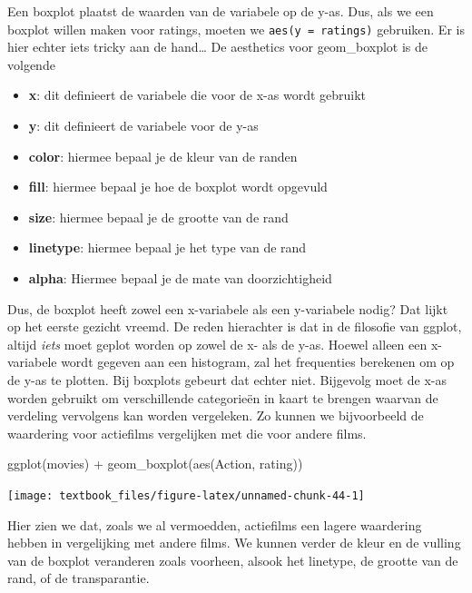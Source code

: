 \documentclass[]{tufte-book}
\newenvironment{Shaded}{}{}
\newcommand{\FunctionTok}[1]{\textcolor[rgb]{0.02,0.16,0.49}{#1}}
\newcommand{\NormalTok}[1]{#1}
\newcommand{\SpecialCharTok}[1]{\textcolor[rgb]{0.25,0.44,0.63}{#1}}
\providecommand{\tightlist}{%
  \setlength{\itemsep}{0pt}\setlength{\parskip}{0pt}}
\begin{document}
Een boxplot plaatst de waarden van de variabele op de y-as. Dus, als we een boxplot willen maken voor ratings, moeten we \texttt{aes(y\ =\ ratings)} gebruiken. Er is hier echter iets tricky aan de hand\ldots{} De aesthetics voor geom\_boxplot is de volgende

\begin{itemize}
\tightlist
\item
  \textbf{x}: dit definieert de variabele die voor de x-as wordt gebruikt
\item
  \textbf{y}: dit definieert de variabele voor de y-as
\item
  \textbf{color}: hiermee bepaal je de kleur van de randen
\item
  \textbf{fill}: hiermee bepaal je hoe de boxplot wordt opgevuld
\item
  \textbf{size}: hiermee bepaal je de grootte van de rand
\item
  \textbf{linetype}: hiermee bepaal je het type van de rand
\item
  \textbf{alpha}: Hiermee bepaal je de mate van doorzichtigheid
\end{itemize}

Dus, de boxplot heeft zowel een x-variabele als een y-variabele nodig? Dat lijkt op het eerste gezicht vreemd. De reden hierachter is dat in de filosofie van ggplot, altijd \emph{iets} moet geplot worden op zowel de x- als de y-as. Hoewel alleen een x-variabele wordt gegeven aan een histogram, zal het frequenties berekenen om op de y-as te plotten. Bij boxplots gebeurt dat echter niet. Bijgevolg moet de x-as worden gebruikt om verschillende categorieën in kaart te brengen waarvan de verdeling vervolgens kan worden vergeleken. Zo kunnen we bijvoorbeeld de waardering voor actiefilms vergelijken met die voor andere films.

\begin{Shaded}
\begin{Highlighting}[]
\FunctionTok{ggplot}\NormalTok{(movies) }\SpecialCharTok{+}
  \FunctionTok{geom\_boxplot}\NormalTok{(}\FunctionTok{aes}\NormalTok{(Action, rating))}
\end{Highlighting}
\end{Shaded}

\texttt{[image: textbook\_files/figure-latex/unnamed-chunk-44-1]}

Hier zien we dat, zoals we al vermoedden, actiefilms een lagere waardering hebben in vergelijking met andere films. We kunnen verder de kleur en de vulling van de boxplot veranderen zoals voorheen, alsook het linetype, de grootte van de rand, of de transparantie.
\end{document}

